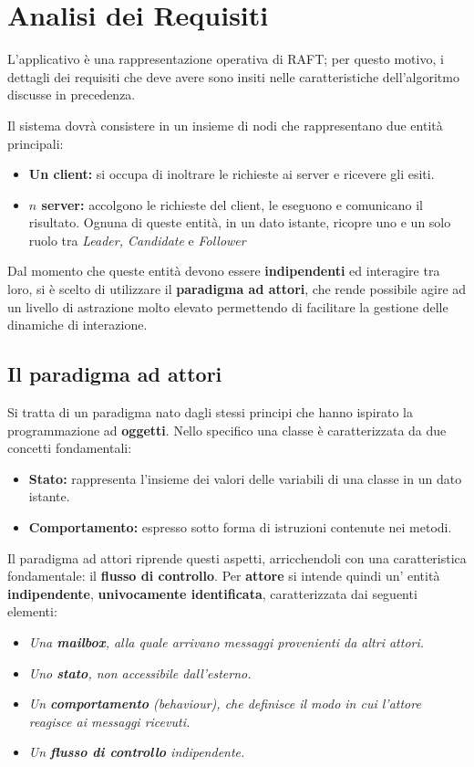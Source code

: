 \section{Analisi dei Requisiti}
L'applicativo è una rappresentazione operativa di RAFT; per questo motivo, i dettagli dei requisiti che deve avere sono insiti nelle caratteristiche dell'algoritmo discusse in precedenza. 

Il sistema dovrà consistere in un insieme di nodi che rappresentano due entità principali:
	\begin{itemize}
		\item \textbf{Un client:} si occupa di inoltrare le richieste ai server e ricevere gli esiti.
		\item \textbf{$n$ server:} accolgono le richieste del client, le eseguono e comunicano il risultato. Ognuna di queste entità, in un dato istante, ricopre uno e un solo ruolo tra \textit{Leader, Candidate} e \textit{Follower}
	\end{itemize}

Dal momento che queste entità devono essere \textbf{indipendenti} ed interagire tra loro, si è scelto di utilizzare il \textbf{paradigma ad attori}, che rende possibile agire ad un livello di astrazione molto elevato permettendo di facilitare la gestione delle dinamiche di interazione.


	\subsection{Il paradigma ad attori} \label{Actors}
	Si tratta di un paradigma nato dagli stessi principi che hanno ispirato la programmazione ad \textbf{oggetti}. Nello specifico una classe è caratterizzata da due concetti fondamentali:
	\begin{itemize}
		\item{\textbf{Stato:}} rappresenta l'insieme dei valori delle variabili di una classe in un dato istante. 
		\item{\textbf{Comportamento:}} espresso sotto forma di istruzioni contenute nei metodi.
	\end{itemize}

	Il paradigma ad attori riprende questi aspetti, arricchendoli con una caratteristica fondamentale: il \textbf{flusso di controllo}. 
	Per \textbf{attore} si intende quindi un' entità \textbf{indipendente}, \textbf{univocamente identificata}, caratterizzata dai seguenti elementi:
	\begin{itemize}
		\item \emph{Una \textbf{mailbox}, alla quale arrivano messaggi provenienti da altri attori.}
		\item \emph{Uno \textbf{stato}, non accessibile dall'esterno.}
		\item \emph{Un \textbf{comportamento} (behaviour), che definisce il modo in cui l'attore reagisce ai messaggi ricevuti.}
		\item \emph{Un \textbf{flusso di controllo} indipendente.}
	\end{itemize}

